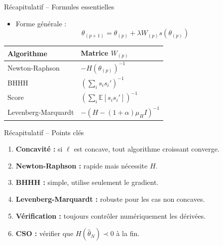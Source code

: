 \documentclass[11pt,aspectratio=169]{beamer}
\begin{document}
\begin{frame}{Récapitulatif -- Formules essentielles}

\begin{itemize}

\item Forme générale :
  \[
  \boxed{\theta_{(p+1)} = \theta_{(p)} + \lambda W_{(p)} s(\theta_{(p)})}
  \]

\end{itemize}

\vspace{0.2cm}

\begin{center}
    \renewcommand{\arraystretch}{1.5}
    \begin{tabular}{ll}
        \toprule
        \textbf{Algorithme} & \textbf{Matrice $W_{(p)}$} \\
        \midrule
        Newton-Raphson & $-H(\theta_{(p)})^{-1}$ \\
        BHHH & $\left(\sum_i s_i s_i'\right)^{-1}$ \\
        Score & $\left(\sum_i \mathbb{E}[s_i s_i']\right)^{-1}$ \\
        Levenberg-Marquardt & $-\left(H - (1+\alpha)\mu_H I\right)^{-1}$ \\
        \bottomrule
    \end{tabular}
\end{center}

\end{frame}

\begin{frame}{Récapitulatif -- Points clés}

\begin{enumerate}

\item \textbf{Concavité :} si $\ell$ est concave, tout algorithme croissant converge.\newline

\item \textbf{Newton-Raphson :} rapide mais nécessite $H$.\newline

\item \textbf{BHHH :} simple, utilise seulement le gradient.\newline

\item \textbf{Levenberg-Marquardt :} robuste pour les cas non concaves.\newline

\item \textbf{Vérification :} toujours contrôler numériquement les dérivées.\newline

\item \textbf{CSO :} vérifier que $H(\hat{\theta}_N) \prec 0$ à la fin.

\end{enumerate}

\end{frame}
\end{document}
